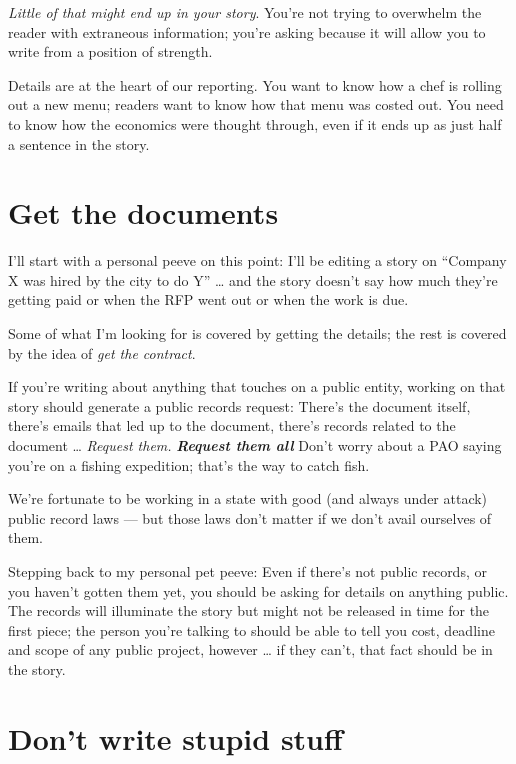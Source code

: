 \documentclass[
  11pt,
  american,
  letterpaperpaper,
  extrafontsizes,onecolumn,openright
  ]{memoir}
\begin{document}
\emph{Little of that might end up in your story}. You're not trying to overwhelm the reader with extraneous information; you're asking because it will allow you to write from a position of strength.

Details are at the heart of our reporting. You want to know how a chef is rolling out a new menu; readers want to know how that menu was costed out. You need to know how the economics were thought through, even if it ends up as just half a sentence in the story.

\hypertarget{get-the-documents}{%
\section*{Get the documents}\label{get-the-documents}}

I'll start with a personal peeve on this point: I'll be editing a story on \enquote{Company X was hired by the city to do Y} \ldots{} and the story doesn't say how much they're getting paid or when the RFP went out or when the work is due.

Some of what I'm looking for is covered by getting the details; the rest is covered by the idea of \emph{get the contract}.

If you're writing about anything that touches on a public entity, working on that story should generate a public records request: There's the document itself, there's emails that led up to the document, there's records related to the document \ldots{} \emph{Request them.} \textbf{\emph{Request them all}} Don't worry about a PAO saying you're on a fishing expedition; that's the way to catch fish.

We're fortunate to be working in a state with good (and always under attack) public record laws --- but those laws don't matter if we don't avail ourselves of them.

Stepping back to my personal pet peeve: Even if there's not public records, or you haven't gotten them yet, you should be asking for details on anything public. The records will illuminate the story but might not be released in time for the first piece; the person you're talking to should be able to tell you cost, deadline and scope of any public project, however \ldots{} if they can't, that fact should be in the story.

\hypertarget{dont-write-stupid-stuff}{%
\section*{Don't write stupid stuff}\label{dont-write-stupid-stuff}}
\end{document}
